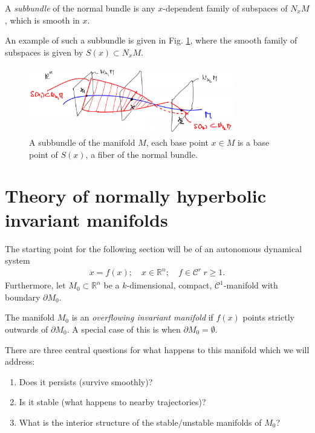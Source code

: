 \begin{definition}
	A \emph{subbundle} of the normal bundle is any $x$-dependent family of subspaces of $N_{x}M$, which is smooth in $x$.
\end{definition}
An example of such a subbundle is given in Fig. \ref{fig:subbundle_ex}, where the smooth family of subspaces is given by $S(x)\subset N_{x}M$.
\begin{figure}[h!]
	\centering
	\includegraphics[width=0.8\textwidth]{figures/ch9/10subbundle_ex.png}
	\caption{A subbundle of the manifold $M$, each base point $x\in M$ is a base point of $S(x)$, a fiber of the normal bundle.}
	\label{fig:subbundle_ex}
\end{figure}

\newpage
\section{Theory of normally hyperbolic invariant manifolds}
The starting point for the following section will be of an autonomous dynamical system
\begin{align}
	\dot{x}=f(x);\quad x \in \mathbb{R}^{n};\quad f\in\mathcal{C}^{r}\ r\geq 1.
\end{align}
Furthermore, let $M_0\subset \mathbb{R}^{n}$ be a $k$-dimensional, compact, $\mathcal{C}^{1}$-manifold with boundary $\partial M_{0}$.

\begin{definition}
	The manifold $M_0$ is an \emph{overflowing invariant manifold} if $f(x)$ points strictly outwards of $\partial M_0$. A special case of this is when $\partial M_0= \emptyset$.
\end{definition}

There are three central questions for what happens to this manifold which we will address:
\begin{enumerate}
	\item Does it persists (survive smoothly)?
	\item Is it stable (what happens to nearby trajectories)?
	\item What is the interior structure of the stable/unstable manifolds of $M_0$?
\end{enumerate}

